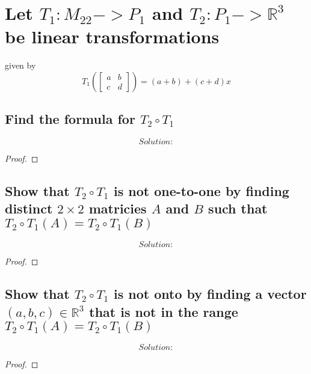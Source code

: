 \documentclass[../main.tex]{subfiles}
\begin{document}
\section[Problem 2]{Let $T_{1}:M_{22}->P_{1}$ and $T_{2}:P_{1}->\mathbb{R}^3$ be linear transformations}
given by
$$
  T_{1}(\begin{bmatrix}
    a & b \\
    c & d
  \end{bmatrix})
  = (a + b) + (c + d)x
$$

\subsection{Find the formula for $T_{2} \circ T_{1}$ }
\begin{equation*}
  \boxed{ Solution:}
\end{equation*}
\begin{proof}
\end{proof}
\pagebreak

\subsection{Show that $T_{2} \circ T_{1}$ is not one-to-one by finding distinct $2 \times 2$ matricies $A$ and $B$ such that $T_{2} \circ T_{1}(A)=T_{2} \circ T_{1}(B)$}
\begin{equation*}
  \boxed{ Solution:}
\end{equation*}
\begin{proof}
\end{proof}

\subsection{Show that $T_{2} \circ T_{1}$ is not onto by finding a vector $(a,b,c) \in \mathbb{R}^3$ that is not in the range $T_{2} \circ T_{1}(A)=T_{2} \circ T_{1}(B)$}

\begin{equation*}
  \boxed{ Solution:}
\end{equation*}
\begin{proof}
\end{proof}
\end{document}
